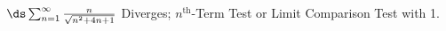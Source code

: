 {$\ds\sum_{n=1}^\infty \frac{n}{\sqrt{n^2+4n+1}}$
}
{Diverges; $n^\text{th}$-Term Test or Limit Comparison Test with 1.
}